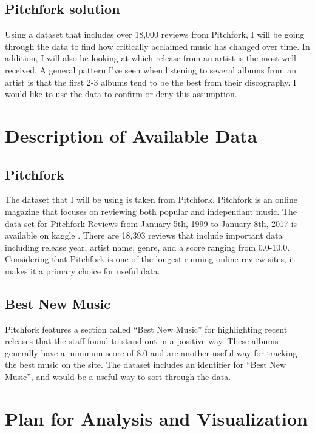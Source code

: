 \documentclass{article}
\begin{document}
\subsection{Pitchfork solution}\label{pitchfork-solution}

Using a dataset that includes over 18,000 reviews from Pitchfork, I will
be going through the data to find how critically acclaimed music has
changed over time. In addition, I will also be looking at which release
from an artist is the most well received. A general pattern I've seen
when listening to several albums from an artist is that the first 2-3
albums tend to be the best from their discography. I would like to use
the data to confirm or deny this assumption.

\section{Description of Available
Data}\label{description-of-available-data}

\subsection{Pitchfork}\label{pitchfork}

The dataset that I will be using is taken from Pitchfork. Pitchfork is
an online magazine that focuses on reviewing both popular and
independant music. The data set for Pitchfork Reviews from January 5th,
1999 to January 8th, 2017 is available on kaggle \citep{kaggle}. There
are 18,393 reviews that include important data including release year,
artist name, genre, and a score ranging from 0.0-10.0. Considering that
Pitchfork is one of the longest running online review sites, it makes it
a primary choice for useful data.

\subsection{Best New Music}\label{best-new-music}

Pitchfork features a section called ``Best New Music'' for highlighting
recent releases that the staff found to stand out in a positive way.
These albums generally have a minimum score of 8.0 and are another
useful way for tracking the best music on the site. The dataset includes
an identifier for ``Best New Music'', and would be a useful way to sort
through the data.

\section{Plan for Analysis and
Visualization}\label{plan-for-analysis-and-visualization}
\end{document}

